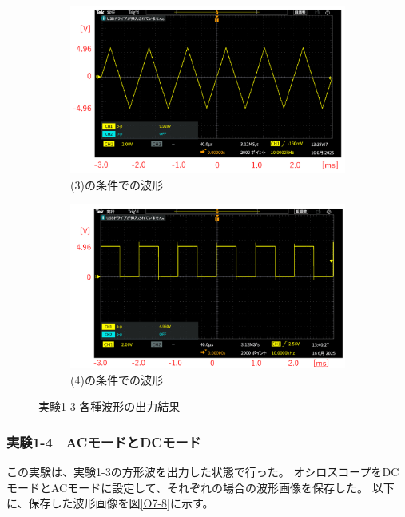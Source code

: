 \documentclass[uplatex, a4j, dvipdfmx]{jsarticle}
\begin{document}
\begin{figure}[htbp]
    \begin{subfigure}[b]{0.48\textwidth}
        \centering
        \includegraphics[width=\linewidth]{picture/O5.png}
        \caption{(3)の条件での波形}
        \label{O5}
    \end{subfigure}
    \hfill
    \begin{subfigure}[b]{0.48\textwidth}
        \centering
        \includegraphics[width=\linewidth]{picture/O6.png}
        \caption{(4)の条件での波形}
        \label{O6}
    \end{subfigure}
    \caption{実験1-3 各種波形の出力結果}
    \label{O3-6}
\end{figure}

\subsubsection*{実験1-4　ACモードとDCモード}
この実験は、実験1-3の方形波を出力した状態で行った。
オシロスコープをDCモードとACモードに設定して、それぞれの場合の波形画像を保存した。
以下に、保存した波形画像を図\ref{O7-8}に示す。
\end{document}
